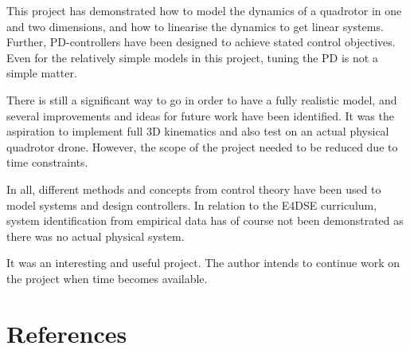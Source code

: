\documentclass[a4paper]{report}
\begin{document}
This project has demonstrated how to model the dynamics of a quadrotor in one and two dimensions, and how to linearise the dynamics to get linear systems.
Further, PD-controllers have been designed to achieve stated control objectives.
Even for the relatively simple models in this project, tuning the PD is not a simple matter.

There is still a significant way to go in order to have a fully realistic model, and several improvements and ideas for future work have been identified. It was the aspiration to implement full 3D kinematics and also test on an actual physical quadrotor drone. However, the scope of the project needed to be reduced due to time constraints.

In all, different methods and concepts from control theory have been used to model systems and design controllers. 
In relation to the E4DSE curriculum, system identification from empirical data has of course not been demonstrated as there was no actual physical system.

It was an interesting and useful project. The author intends to continue work on the project when time becomes available.

\cleardoublepage
\chapter{References}
\printbibliography[heading=none]

\newpage
\end{document}
